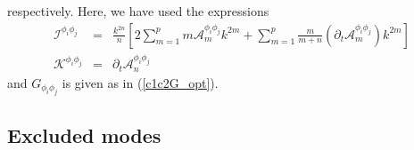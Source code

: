 \documentclass[notitlepage,eqsecnum,bm,amsmath,preprintnumbers,superscriptaddress,nofootinbib,aps,11pt]{revtex4-1}
\def\eq#1{(\ref{#1})}
\begin{document}
respectively. Here, we have used the expressions
\begin{eqnarray}
\mathcal{I}^{\phi_i\phi_j}&=&\frac{k^{2n}}{n}\left[2\sum_{m=1}^{p} m\mathcal{A}^{\phi_i\phi_j}_m k^{2m}+\sum_{m=1}^{p}\frac{m}{m+n}(\partial_t\mathcal{A}^{\phi_i\phi_j}_m) k^{2m}\right]\\
\mathcal{K}^{\phi_i\phi_j}&=&\partial_t\mathcal{A}^{\phi_i\phi_j}_n
\end{eqnarray}
and $G_{\phi_i\phi_j}$ is given as in \eq{c1c2G_opt}.





\subsection{Excluded modes}
\label{subsec:ExcludedModes}
\end{document}
